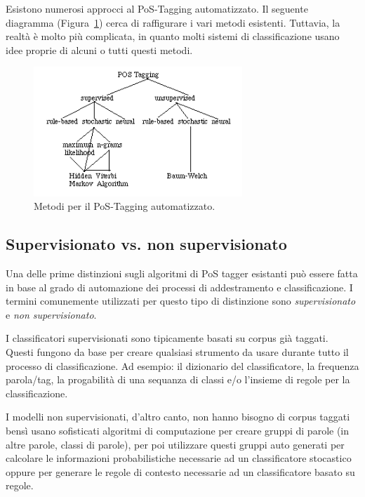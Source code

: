 Esistono numerosi approcci al PoS-Tagging automatizzato.
Il seguente diagramma (Figura~\ref{fig:feedforwardNeuralNetwork}) cerca di raffigurare i vari metodi esistenti.
Tuttavia, la realt\`a \`e molto pi\`u complicata, in quanto molti sistemi di classificazione usano idee proprie di alcuni o tutti questi metodi.

\begin{figure}[tp]
  \centering
  \begin{center}
    \includegraphics[width=0.7\textwidth]{./images/tagging_overview.png}
  \end{center}
  \caption{Metodi per il PoS-Tagging automatizzato.}
  \label{fig:feedforwardNeuralNetwork}
\end{figure}

\subsection{Supervisionato vs. non supervisionato}
\nocite{BrillMarcus:1993}
\nocite{Brill:1995}
\nocite{Shutze:1993}

Una delle prime distinzioni sugli algoritmi di PoS tagger esistanti pu\`o essere fatta in base al grado di automazione dei processi di addestramento e classificazione.
I termini comunemente utilizzati per questo tipo di distinzione sono \emph{supervisionato} e \emph{non supervisionato}.

I classificatori supervisionati sono tipicamente basati su corpus gi\`a taggati.
Questi fungono da base per creare qualsiasi strumento da usare durante tutto il processo di classificazione.
Ad esempio: il dizionario del classificatore, la frequenza parola/tag, la progabilit\`a di una sequanza di classi e/o l'insieme di regole per la classificazione.

I modelli non supervisionati, d'altro canto, non hanno bisogno di corpus taggati bens\`i usano sofisticati algoritmi di computazione per creare gruppi di parole (in altre parole, classi di parole), per poi utilizzare questi gruppi auto generati per calcolare le informazioni probabilistiche necessarie ad un classificatore stocastico oppure per generare le regole di contesto necessarie ad un classificatore basato su regole.

